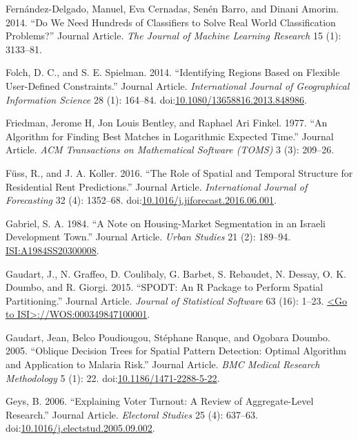 \documentclass[]{elsarticle} %
\begin{document}
\hypertarget{ref-FernandezDelgado2014}{}
Fernández-Delgado, Manuel, Eva Cernadas, Senén Barro, and Dinani Amorim.
2014. ``Do We Need Hundreds of Classifiers to Solve Real World
Classification Problems?'' Journal Article. \emph{The Journal of Machine
Learning Research} 15 (1): 3133--81.

\hypertarget{ref-Folch2014}{}
Folch, D. C., and S. E. Spielman. 2014. ``Identifying Regions Based on
Flexible User-Defined Constraints.'' Journal Article.
\emph{International Journal of Geographical Information Science} 28 (1):
164--84.
doi:\href{https://doi.org/10.1080/13658816.2013.848986}{10.1080/13658816.2013.848986}.

\hypertarget{ref-Friedman1977}{}
Friedman, Jerome H, Jon Louis Bentley, and Raphael Ari Finkel. 1977.
``An Algorithm for Finding Best Matches in Logarithmic Expected Time.''
Journal Article. \emph{ACM Transactions on Mathematical Software (TOMS)}
3 (3): 209--26.

\hypertarget{ref-Fuss2016}{}
Füss, R., and J. A. Koller. 2016. ``The Role of Spatial and Temporal
Structure for Residential Rent Predictions.'' Journal Article.
\emph{International Journal of Forecasting} 32 (4): 1352--68.
doi:\href{https://doi.org/10.1016/j.jiforecast.2016.06.001}{10.1016/j.jiforecast.2016.06.001}.

\hypertarget{ref-Gabriel1984}{}
Gabriel, S. A. 1984. ``A Note on Housing-Market Segmentation in an
Israeli Development Town.'' Journal Article. \emph{Urban Studies} 21
(2): 189--94. \url{ISI:A1984SS20300008}.

\hypertarget{ref-Gaudart2015}{}
Gaudart, J., N. Graffeo, D. Coulibaly, G. Barbet, S. Rebaudet, N.
Dessay, O. K. Doumbo, and R. Giorgi. 2015. ``SPODT: An R Package to
Perform Spatial Partitioning.'' Journal Article. \emph{Journal of
Statistical Software} 63 (16): 1--23.
\href{\%3CGo\%20to\%20ISI\%3E://WOS:000349847100001}{\textless{}Go to ISI\textgreater{}://WOS:000349847100001}.

\hypertarget{ref-Gaudart2005}{}
Gaudart, Jean, Belco Poudiougou, Stéphane Ranque, and Ogobara Doumbo.
2005. ``Oblique Decision Trees for Spatial Pattern Detection: Optimal
Algorithm and Application to Malaria Risk.'' Journal Article. \emph{BMC
Medical Research Methodology} 5 (1): 22.
doi:\href{https://doi.org/10.1186/1471-2288-5-22}{10.1186/1471-2288-5-22}.

\hypertarget{ref-Geys2006}{}
Geys, B. 2006. ``Explaining Voter Turnout: A Review of Aggregate-Level
Research.'' Journal Article. \emph{Electoral Studies} 25 (4): 637--63.
doi:\href{https://doi.org/10.1016/j.electstud.2005.09.002}{10.1016/j.electstud.2005.09.002}.
\end{document}
